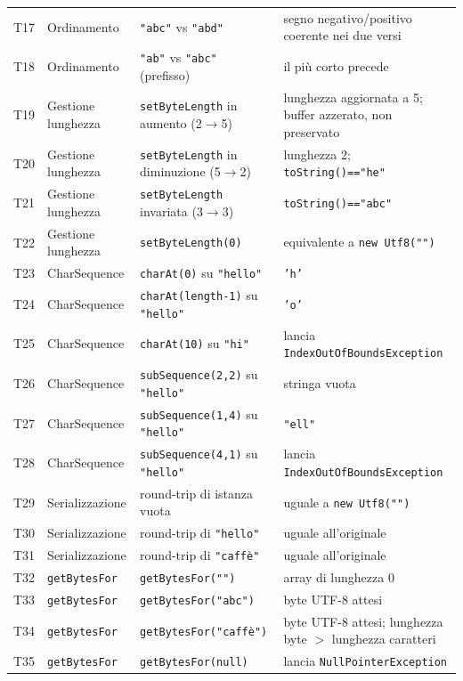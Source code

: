 \begin{longtable}{@{}p{0.7cm}p{2.3cm}p{6.1cm}p{6.1cm}@{}}
T17 & Ordinamento & \texttt{"abc"} vs \texttt{"abd"} & segno negativo/positivo coerente nei due versi \\
T18 & Ordinamento & \texttt{"ab"} vs \texttt{"abc"} (prefisso) & il più corto precede \\
T19 & Gestione lunghezza & \texttt{setByteLength} in aumento (2$\to$5) & lunghezza aggiornata a 5; buffer azzerato, non preservato \\
T20 & Gestione lunghezza & \texttt{setByteLength} in diminuzione (5$\to$2) & lunghezza 2; \texttt{toString()=="he"} \\
T21 & Gestione lunghezza & \texttt{setByteLength} invariata (3$\to$3) & \texttt{toString()=="abc"} \\
T22 & Gestione lunghezza & \texttt{setByteLength(0)} & equivalente a \texttt{new Utf8("")} \\
T23 & CharSequence & \texttt{charAt(0)} su \texttt{"hello"} & \texttt{'h'} \\
T24 & CharSequence & \texttt{charAt(length-1)} su \texttt{"hello"} & \texttt{'o'} \\
T25 & CharSequence & \texttt{charAt(10)} su \texttt{"hi"} & lancia \texttt{IndexOutOfBoundsException} \\
T26 & CharSequence & \texttt{subSequence(2,2)} su \texttt{"hello"} & stringa vuota \\
T27 & CharSequence & \texttt{subSequence(1,4)} su \texttt{"hello"} & \texttt{"ell"} \\
T28 & CharSequence & \texttt{subSequence(4,1)} su \texttt{"hello"} & lancia \texttt{IndexOutOfBoundsException} \\
T29 & Serializzazione & round-trip di istanza vuota & uguale a \texttt{new Utf8("")} \\
T30 & Serializzazione & round-trip di \texttt{"hello"} & uguale all'originale \\
T31 & Serializzazione & round-trip di \texttt{"caff\`e"} & uguale all'originale \\
T32 & \texttt{getBytesFor} & \texttt{getBytesFor("")} & array di lunghezza 0 \\
T33 & \texttt{getBytesFor} & \texttt{getBytesFor("abc")} & byte UTF-8 attesi \\
T34 & \texttt{getBytesFor} & \texttt{getBytesFor("caff\`e")} & byte UTF-8 attesi; lunghezza byte $>$ lunghezza caratteri \\
T35 & \texttt{getBytesFor} & \texttt{getBytesFor(null)} & lancia \texttt{NullPointerException} \\
\bottomrule
\end{longtable}


